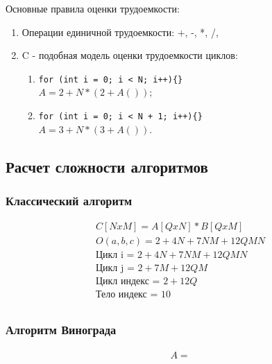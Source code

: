 \documentclass[a4paper, 14pt]{article}
\begin{document}
	Основные правила оценки трудоемкости:
	\begin{enumerate}
		\item Операции единичной трудоемкости: +, -, *, /, %
		\item C - подобная модель оценки трудоемкости циклов:
			\begin{enumerate}
				\item 
					\lstinline|for (int i = 0; i < N; i++){}| \\
					$ A = 2 + N * (2 + A()) $;
				\item
					\lstinline|for (int i = 0; i < N + 1; i++){}| \\
					$ A = 3 + N * (3 + A()) $.
				
			\end{enumerate}
	\end{enumerate}
	
	
	\subsection{Расчет сложности алгоритмов}
	
	\subsubsection{Классический алгоритм}	
	\begin{equation}
	\boxed{\begin{aligned}
		C[NxM] = A[QxN] * B[QxM] \\
		O(a, b, c) = 2 + 4N + 7NM + 12QMN \\ 
		\text{Цикл i = } 2 + 4N + 7NM + 12QMN \\
		\text{Цикл j = } 2 + 7M + 12QM \\ 
		\text{Цикл индекс = } 2 + 12Q \\ 
		\text{Тело индекс = } 10 \\	
		\end{aligned}}
	\end{equation}
	
	\subsubsection{Алгоритм Винограда}
	
	\begin{equation}
	\boxed{\begin{aligned}
		A = 
		\end{aligned}}
	\end{equation}	
	
\end{document}
